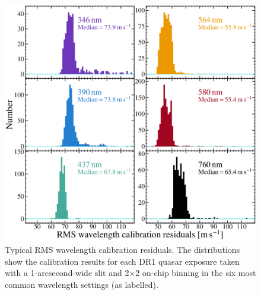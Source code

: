 \documentclass[fleqn,usenatbib,usedcolumn]{mnras}
\begin{document}
\begin{figure}
\begin{center}
\includegraphics[width=0.95\columnwidth]{DR1_wavcalrms_1p0_2x2.pdf}
\vspace{-1em}
\caption{Typical RMS wavelength calibration residuals. The distributions show the calibration results for each DR1 quasar exposure taken with a 1-arcsecond-wide slit and 2$\times$2 on-chip binning in the six most common wavelength settings (as labelled).}
\label{f:wavcal}
\end{center}
\end{figure}
\end{document}
